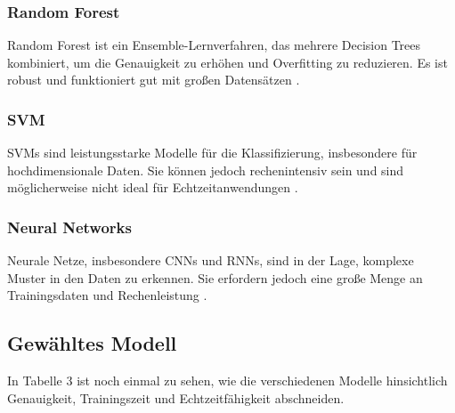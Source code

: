 \subsubsection{Random Forest}
Random Forest ist ein Ensemble-Lernverfahren, das mehrere Decision Trees kombiniert, um die Genauigkeit zu erhöhen und Overfitting zu reduzieren. Es ist robust und funktioniert gut mit großen Datensätzen \cite{chen2012random}.

\subsubsection{\ac{SVM}}
SVMs sind leistungsstarke Modelle für die Klassifizierung, insbesondere für hochdimensionale Daten. Sie können jedoch rechenintensiv sein und sind möglicherweise nicht ideal für Echtzeitanwendungen \cite{mammone2009support}.

\subsubsection{Neural Networks}
Neurale Netze, insbesondere \ac{CNNs} und \ac{RNNs}, sind in der Lage, komplexe Muster in den Daten zu erkennen. Sie erfordern jedoch eine große Menge an Trainingsdaten und Rechenleistung \cite{choi2020introduction}.

\subsection{Gewähltes Modell}
In Tabelle 3 ist noch einmal zu sehen, wie die verschiedenen Modelle hinsichtlich Genauigkeit, Trainingszeit und Echtzeitfähigkeit abschneiden.

\bgroup
\def\arraystretch{1.5}
\begin{table}[h]
	\centering
	\caption{Vergleich der evaluierten ML-Modelle}
	\label{tab:modellvergleich}
\end{table}
\egroup


